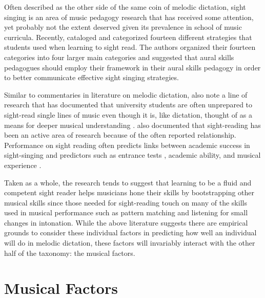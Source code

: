 \documentclass[12pt,]{book}
\begin{document}
Often described as the other side of the same coin of melodic dictation, sight singing is an area of music pedagogy research that has received some attention, yet probably not the extent deserved given its prevalence in school of music curricula.
Recently, \citet{fournierCognitiveStrategiesSightsinging2017a} cataloged and categorized fourteen different strategies that students used when learning to sight read.
The authors organized their fourteen categories into four larger main categories and suggested that aural skills pedagogues should employ their framework in their aural skills pedagogy in order to better communicate effective sight singing strategies.

Similar to commentaries in literature on melodic dictation, \citet{fournierCognitiveStrategiesSightsinging2017a} also note a line of research that has documented that university students are often unprepared to sight-read single lines of music \citep{asmusMusicTeachingMusic2004, thompsonPitchInternalizationStrategies2003} even though it is, like dictation, thought of as a means for deeper musical understanding \citep{karpinskiAuralSkillsAcquisition2000, rogersTeachingApproachesMusic2004}.
\citet{fournierCognitiveStrategiesSightsinging2017a} also documented that sight-reading has been an active area of research because of the often reported relationship.
Performance on sight reading often predicts links between academic success in sight-singing and predictors such as entrance tests \citep{harrisonValidityMusicalAptitude1987}, academic ability, and musical experience \citep{harrisonEffectsMusicalAptitude1994}.

Taken as a whole, the research tends to suggest that learning to be a fluid and competent sight reader helps musicians hone their skills by bootstrapping other musical skills since those needed for sight-reading touch on many of the skills used in musical performance such as pattern matching and listening for small changes in intonation.
While the above literature suggests there are empirical grounds to consider these individual factors in predicting how well an individual will do in melodic dictation, these factors will invariably interact with the other half of the taxonomy: the musical factors.

\hypertarget{musical-factors}{%
\section{Musical Factors}\label{musical-factors}}
\end{document}
